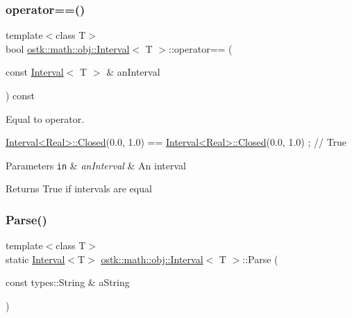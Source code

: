 \subsubsection{\texorpdfstring{operator==()}{operator==()}}
{\footnotesize\ttfamily template$<$class T$>$ \\
bool \hyperlink{classostk_1_1math_1_1obj_1_1_interval}{ostk\+::math\+::obj\+::\+Interval}$<$ T $>$\+::operator== (\begin{DoxyParamCaption}\item[{const \hyperlink{classostk_1_1math_1_1obj_1_1_interval}{Interval}$<$ T $>$ \&}]{an\+Interval }\end{DoxyParamCaption}) const}



Equal to operator. 


\begin{DoxyCode}
\hyperlink{classostk_1_1math_1_1obj_1_1_interval_a48e9f436e8994c49026a1ecd503bc190}{Interval<Real>::Closed}(0.0, 1.0) == \hyperlink{classostk_1_1math_1_1obj_1_1_interval_a48e9f436e8994c49026a1ecd503bc190}{Interval<Real>::Closed}(0.0,
       1.0) ; \textcolor{comment}{// True}
\end{DoxyCode}



\begin{DoxyParams}[1]{Parameters}
\mbox{\tt in}  & {\em an\+Interval} & An interval \\
\hline
\end{DoxyParams}
\begin{DoxyReturn}{Returns}
True if intervals are equal 
\end{DoxyReturn}
\mbox{\label{classostk_1_1math_1_1obj_1_1_interval_a8013b6fe2914101612ae83ee815110e4}} 
\subsubsection{\texorpdfstring{Parse()}{Parse()}}
{\footnotesize\ttfamily template$<$class T$>$ \\
static \hyperlink{classostk_1_1math_1_1obj_1_1_interval}{Interval}$<$T$>$ \hyperlink{classostk_1_1math_1_1obj_1_1_interval}{ostk\+::math\+::obj\+::\+Interval}$<$ T $>$\+::Parse (\begin{DoxyParamCaption}\item[{const types\+::\+String \&}]{a\+String }\end{DoxyParamCaption})\hspace{0.3cm}{\ttfamily [static]}}



